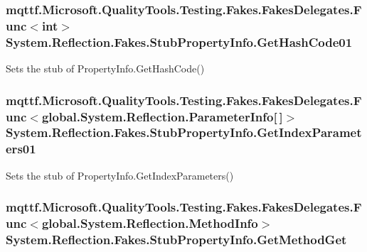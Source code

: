\hypertarget{class_system_1_1_reflection_1_1_fakes_1_1_stub_property_info_abceb4de56ce5d74fdf9c32bec6894b0b}{
\subsubsection[{Get\-Hash\-Code01}]{\setlength{\rightskip}{0pt plus 5cm}mqttf.\-Microsoft.\-Quality\-Tools.\-Testing.\-Fakes.\-Fakes\-Delegates.\-Func$<$int$>$ System.\-Reflection.\-Fakes.\-Stub\-Property\-Info.\-Get\-Hash\-Code01}}\label{class_system_1_1_reflection_1_1_fakes_1_1_stub_property_info_abceb4de56ce5d74fdf9c32bec6894b0b}


Sets the stub of Property\-Info.\-Get\-Hash\-Code()

\hypertarget{class_system_1_1_reflection_1_1_fakes_1_1_stub_property_info_a7ff8edd5c71d919c3ee40f8efabee1f4}{
\subsubsection[{Get\-Index\-Parameters01}]{\setlength{\rightskip}{0pt plus 5cm}mqttf.\-Microsoft.\-Quality\-Tools.\-Testing.\-Fakes.\-Fakes\-Delegates.\-Func$<$global.\-System.\-Reflection.\-Parameter\-Info\mbox{[}$\,$\mbox{]}$>$ System.\-Reflection.\-Fakes.\-Stub\-Property\-Info.\-Get\-Index\-Parameters01}}\label{class_system_1_1_reflection_1_1_fakes_1_1_stub_property_info_a7ff8edd5c71d919c3ee40f8efabee1f4}


Sets the stub of Property\-Info.\-Get\-Index\-Parameters()

\hypertarget{class_system_1_1_reflection_1_1_fakes_1_1_stub_property_info_a9fe7b98d4ed81ee88a1d353f6aa7f95b}{
\subsubsection[{Get\-Method\-Get}]{\setlength{\rightskip}{0pt plus 5cm}mqttf.\-Microsoft.\-Quality\-Tools.\-Testing.\-Fakes.\-Fakes\-Delegates.\-Func$<$global.\-System.\-Reflection.\-Method\-Info$>$ System.\-Reflection.\-Fakes.\-Stub\-Property\-Info.\-Get\-Method\-Get}}\label{class_system_1_1_reflection_1_1_fakes_1_1_stub_property_info_a9fe7b98d4ed81ee88a1d353f6aa7f95b}


